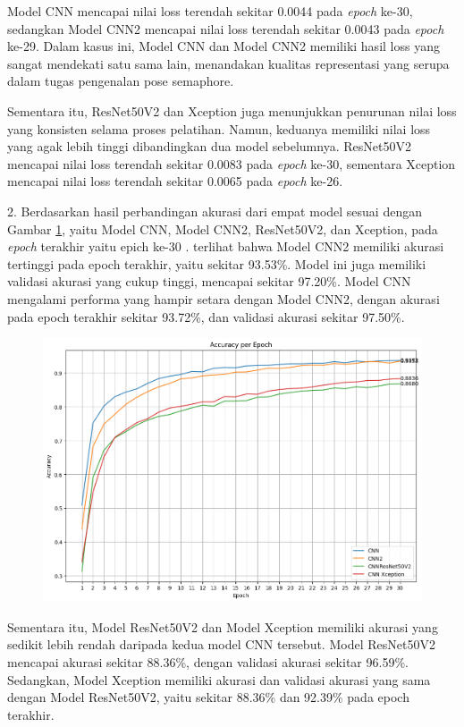 Model CNN mencapai nilai loss terendah sekitar 0.0044 pada \textit{epoch} ke-30, sedangkan Model CNN2 mencapai nilai loss terendah sekitar 0.0043 pada \textit{epoch} ke-29. Dalam kasus ini, Model CNN dan Model CNN2 memiliki hasil loss yang sangat mendekati satu sama lain, menandakan kualitas representasi yang serupa dalam tugas pengenalan pose semaphore.

Sementara itu, ResNet50V2 dan Xception juga menunjukkan penurunan nilai loss yang konsisten selama proses pelatihan. Namun, keduanya memiliki nilai loss yang agak lebih tinggi dibandingkan dua model sebelumnya. ResNet50V2 mencapai nilai loss terendah sekitar 0.0083 pada \textit{epoch} ke-30, sementara Xception mencapai nilai loss terendah sekitar 0.0065 pada \textit{epoch} ke-26.

2. Berdasarkan hasil perbandingan akurasi dari empat model sesuai dengan Gambar \ref{fig:GrafikPerbandinganAkurasi}, yaitu Model CNN, Model CNN2, ResNet50V2, dan Xception, pada \textit{epoch} terakhir yaitu epich ke-30 . terlihat bahwa Model CNN2 memiliki akurasi tertinggi pada epoch terakhir, yaitu sekitar 93.53\%. Model ini juga memiliki validasi akurasi yang cukup tinggi, mencapai sekitar 97.20\%. Model CNN mengalami performa yang hampir setara dengan Model CNN2, dengan akurasi pada epoch terakhir sekitar 93.72\%, dan validasi akurasi sekitar 97.50\%.

\begin{figure}[!hbt]
	\centering
	\includegraphics[width=0.7\linewidth]{gambar/bener/Perbandingan_AkurasiCNN.png}
	\label{fig:GrafikPerbandinganAkurasi}
\end{figure}

Sementara itu, Model ResNet50V2 dan Model Xception memiliki akurasi yang sedikit lebih rendah daripada kedua model CNN tersebut. Model ResNet50V2 mencapai akurasi sekitar 88.36\%, dengan validasi akurasi sekitar 96.59\%. Sedangkan, Model Xception memiliki akurasi dan validasi akurasi yang sama dengan Model ResNet50V2, yaitu sekitar 88.36\% dan 92.39\% pada epoch terakhir.

